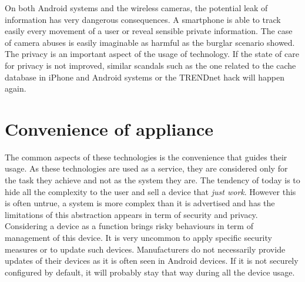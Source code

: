 On both Android systems and the wireless cameras, the potential leak of information has very dangerous consequences.
A smartphone is able to track easily every movement of a user or reveal sensible private information.
The case of camera abuses is easily imaginable as harmful as the burglar scenario showed.\\

The privacy is an important aspect of the usage of technology.
If the state of care for privacy is not improved, similar scandals such as the one related to the cache database in iPhone and Android systems or the TRENDnet hack will happen again.

\section{Convenience of appliance}

The common aspects of these technologies is the convenience that guides their usage.
As these technologies are used as a service, they are considered only for the task they achieve and not as the system they are.
The tendency of today is to hide all the complexity to the user and sell a device that \emph{just work}.
However this is often untrue, a system is more complex than it is advertised and has the limitations of this abstraction appears in term of security and privacy.\\

Considering a device as a function brings risky behaviours in term of management of this device.
It is very uncommon to apply specific security measures or to update such devices.
Manufacturers do not necessarily provide updates of their devices as it is often seen in Android devices.
If it is not securely configured by default, it will probably stay that way during all the device usage.


